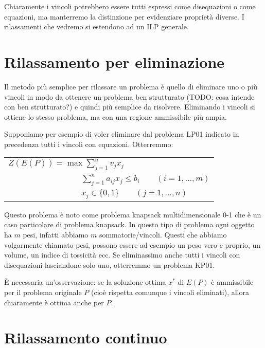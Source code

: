 \documentclass[11pt]{book}
\begin{document}
Chiaramente i vincoli potrebbero essere tutti espressi come
disequazioni o come equazioni, ma manterremo la distinzione per
evidenziare propriet\`a diverse. I rilassamenti che vedremo si
estendono ad un ILP generale.

\section{Rilassamento per eliminazione}

Il metodo pi\`u semplice per rilassare un problema \`e quello di
eliminare uno o pi\`u vincoli in modo da ottenere un problema ben
strutturato (TODO: cosa intende con ben strutturato?) e quindi pi\`u
semplice da risolvere. Eliminando i vincoli si ottiene lo stesso
problema, ma con una regione ammissibile pi\`u ampia.

Supponiamo per esempio di voler eliminare dal problema LP01 indicato
in precedenza tutti i vincoli con equazioni. Otterremmo:

\vspace{11pt}
\begin{center}
\begin{tabular}{l}
$Z(E(P)) = \max \sum \limits_{j=1}^n v_j x_j$\\
$\phantom{Z(E(P)) = max} \sum \limits_{j=1}^n a_{ij}x_j \leq b_i \qquad (i=1,\dots,m)$\\
$\phantom{Z(E(P)) = max} x_j \in \{0,1\} \qquad (j=1,\dots,n)$
\end{tabular}
\end{center}
\vspace{11pt}

Questo problema \`e noto come problema knapsack multidimensionale 0-1
che \`e un caso particolare di problema knapsack. In questo tipo di
problema ogni oggetto ha $m$ pesi, infatti abbiamo $m$
sommatorie/vincoli. Questi che abbiamo volgarmente chiamato pesi,
possono essere ad esempio un peso vero e proprio, un volume, un indice
di tossicit\`a ecc. Se eliminassimo anche tutti i vincoli con
disequazioni lasciandone solo uno, otterremmo un problema KP01.

\`E necessaria un'osservazione: se la soluzione ottima $x^*$ di $E(P)$
\`e ammissibile per il problema originale $P$ (cio\`e rispetta comunque
i vincoli eliminati), allora chiaramente \`e ottima anche per $P$.

\section{Rilassamento continuo}
\end{document}
